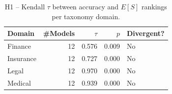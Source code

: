 \begin{table}[t]\centering\small
\caption{H1 -- Kendall $\tau$ between accuracy and $E[S]$ rankings per
taxonomy domain.}\label{tab:h1}
\begin{tabular}{lrrrl}
\toprule
Domain & \#Models & $\tau$ & $p$ & Divergent? \\
\midrule
  Finance & 12 & 0.576 & 0.009 & No \\
  Insurance & 12 & 0.727 & 0.000 & No \\
  Legal & 12 & 0.970 & 0.000 & No \\
  Medical & 12 & 0.939 & 0.000 & No \\
\bottomrule
\end{tabular}
\end{table}